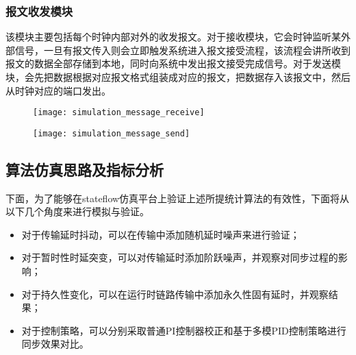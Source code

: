\subsubsection{报文收发模块}
该模块主要包括每个时钟内部对外的收发报文。对于接收模块，它会时钟监听某外部信号，一旦有报文传入则会立即触发系统进入报文接受流程，该流程会讲所收到报文的数据全部存储到本地，同时向系统中发出报文接受完成信号。对于发送模块，会先把数据根据对应报文格式组装成对应的报文，把数据存入该报文中，然后从时钟对应的端口发出。
\begin{figure}[!hbp]
  \centering
  \begin{minipage}[b]{1\textwidth}
    \captionstyle{\centering}
    \centering
    \texttt{[image: simulation\_message\_receive]}
  \end{minipage}     
\end{figure}
\begin{figure}[!hbp]
  \centering
  \begin{minipage}[b]{1\textwidth}
    \captionstyle{\centering}
    \centering
    \texttt{[image: simulation\_message\_send]}
  \end{minipage}     
\end{figure}

\subsection{算法仿真思路及指标分析}
下面，为了能够在stateflow仿真平台上验证上述所提统计算法的有效性，下面将从以下几个角度来进行模拟与验证。
\begin{itemize}[noitemsep,topsep=0pt,parsep=0pt,partopsep=0pt]
  \item 对于传输延时抖动，可以在传输中添加随机延时噪声来进行验证；
  \item 对于暂时性时延突变，可以对传输延时添加阶跃噪声，并观察对同步过程的影响；
  \item 对于持久性变化，可以在运行时链路传输中添加永久性固有延时，并观察结果；
  \item 对于控制策略，可以分别采取普通PI控制器校正和基于多模PID控制策略进行同步效果对比。
\end{itemize}

